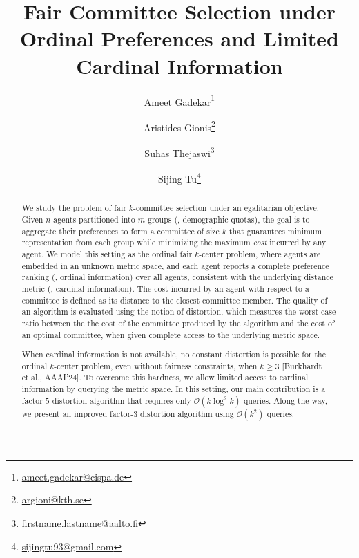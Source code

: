 \documentclass{article}
\author[1]{Ameet Gadekar\footnote{\url{ameet.gadekar@cispa.de}}}
\author[2]{Aristides Gionis\footnote{\url{argioni@kth.se}}}
\author[3]{Suhas Thejaswi\footnote{\url{firstname.lastname@aalto.fi}}}
\author[2]{Sijing Tu\footnote{\url{sijingtu93@gmail.com}}}
\affil[1]{CISPA Helmholtz Center for Information Security, Germany}
\affil[2]{KTH Royal Institute of Technology, Sweden}
\affil[3]{Aalto University, Finland}
\date{}
\newcommand{\bigO}{\ensuremath{\mathcal{O}}\xspace}
\begin{document}
\title{Fair Committee Selection under Ordinal Preferences and Limited Cardinal Information}
\maketitle
\begin{abstract}
  


We study the problem of fair $k$-committee selection under an egalitarian objective. Given $n$ agents partitioned into $m$ groups (\eg, demographic quotas), the goal is to aggregate their preferences to form a committee of size $k$ that guarantees minimum representation from each group while minimizing the maximum \emph{cost} incurred by any agent.
We model this setting as the ordinal fair $k$-center problem, where agents are embedded in an unknown metric space, and each agent reports a complete preference ranking (\ie, ordinal information) over all agents, consistent with the underlying distance metric (\ie, cardinal information).
The cost incurred by an agent with respect to a committee is defined as its distance to the closest committee member.
The quality of an algorithm is evaluated using the notion of distortion, which measures the worst-case ratio between the the cost of the committee produced by the algorithm and  the cost of an optimal committee, when given complete access to the underlying metric space. 


When cardinal information is not available, no constant distortion is possible for the ordinal $k$-center problem, even without fairness constraints,  when $k\geq 3$ [Burkhardt et.al., AAAI'24]. 
To overcome this hardness, we allow limited access to cardinal information by querying the metric space. In this setting, our main contribution is a factor-$5$ distortion algorithm that requires only $\bigO(k \log^2 k)$ queries. Along the way, we present an improved factor-$3$ distortion algorithm using 
$\bigO(k^2)$ 
queries.


\end{abstract} 

\def\thefootnote{*}\def\thefootnote{\arabic{footnote}}
\end{document}
